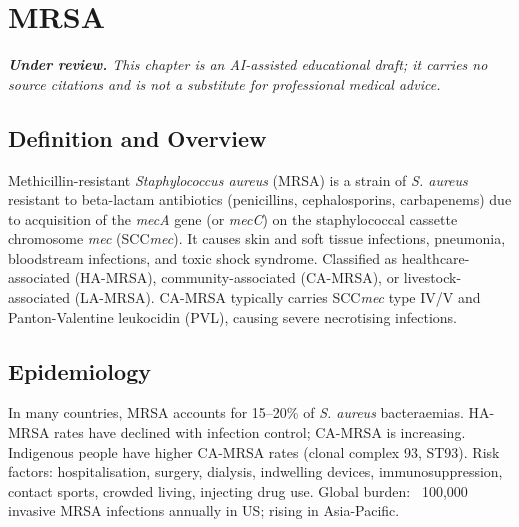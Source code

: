 \chapter{MRSA}

\medskip
\noindent\textit{\textbf{Under review.} This chapter is an AI-assisted educational draft; it carries no source citations and is not a substitute for professional medical advice.}

\section*{Definition and Overview}
Methicillin-resistant \textit{Staphylococcus aureus} (MRSA) is a strain of \textit{S. aureus} resistant to beta-lactam antibiotics (penicillins, cephalosporins, carbapenems) due to acquisition of the \textit{mecA} gene (or \textit{mecC}) on the staphylococcal cassette chromosome \textit{mec} (SCC\textit{mec}). It causes skin and soft tissue infections, pneumonia, bloodstream infections, and toxic shock syndrome. Classified as healthcare-associated (HA-MRSA), community-associated (CA-MRSA), or livestock-associated (LA-MRSA). CA-MRSA typically carries SCC\textit{mec} type IV/V and Panton-Valentine leukocidin (PVL), causing severe necrotising infections.

\section*{Epidemiology}
In many countries, MRSA accounts for 15--20\% of \textit{S. aureus} bacteraemias. HA-MRSA rates have declined with infection control; CA-MRSA is increasing. Indigenous people have higher CA-MRSA rates (clonal complex 93, ST93). Risk factors: hospitalisation, surgery, dialysis, indwelling devices, immunosuppression, contact sports, crowded living, injecting drug use. Global burden: ~100,000 invasive MRSA infections annually in US; rising in Asia-Pacific.

